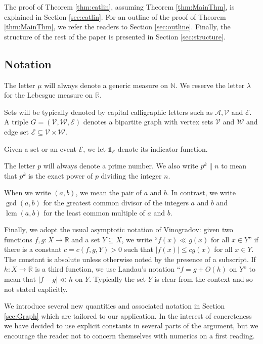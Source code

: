 \documentclass[12pt]{amsart}
\numberwithin{equation}{section}
\theoremstyle{definition}
\theoremstyle{remark}
\newcommand{\N}{\mathbb{N}}
\newcommand{\R}{\mathbb{R}}
\newcommand{\CA}{\mathcal{A}}
\newcommand{\CE}{\mathcal{E}}
\newcommand{\CV}{\mathcal{V}}
\newcommand{\CW}{\mathcal{W}}
\newcommand{\un}{\mathds{1}}
\DeclareMathOperator{\lcm}{lcm}
\renewcommand{\le}{\leqslant}
\begin{document}
The proof of Theorem \ref{thm:catlin}, assuming Theorem \ref{thm:MainThm}, is explained in Section \ref{sec:catlin}. For an outline of the proof of Theorem \ref{thm:MainThm}, we refer the readers to Section \ref{sec:outline}. Finally, the structure of the rest of the paper is presented in Section \ref{sec:structure}.


\subsection*{Notation} The letter $\mu$ will always denote a generic measure on $\N$. We reserve the letter $\lambda$ for the Lebesgue measure on $\R$.

Sets will be typically denoted by capital calligraphic letters such as $\CA,\CV$ and $\CE$. A triple $G=(\CV,\CW,\CE)$ denotes a bipartite graph with vertex sets $\CV$ and $\CW$ and edge set $\CE\subseteq\CV\times\CW$. 

Given a set or an event $\CE$, we let $\un_\CE$ denote its indicator function.

The letter $p$ will always denote a prime number. We also write $p^k\|n$ to mean that $p^k$ is the exact power of $p$ dividing the integer $n$. 

When we write $(a,b)$, we mean the pair of $a$ and $b$. In contrast, we write $\gcd(a,b)$ for the greatest common divisor of the integers $a$ and $b$ and $\lcm(a,b)$ for the least common multiple of $a$ and $b$. 

Finally, we adopt the usual asymptotic notation of Vinogradov: given two functions $f,g:X\to\R$ and a set $Y\subseteq X$, we write ``$f(x)\ll g(x)$ for all $x\in Y$'' if there is a constant $c=c(f,g,Y)>0$ such that $|f(x)|\le cg(x)$ for all $x\in Y$. The constant is absolute unless otherwise noted by the presence of a subscript. If $h:X\to\R$ is a third function, we use Landau's notation ``$f=g+O(h)$ on $Y$'' to mean that $|f-g|\ll h$ on $Y$. Typically the set $Y$ is clear from the context and so not stated explicitly.

We introduce several new quantities and associated notation in Section \ref{sec:Graph} which are tailored to our application. In the interest of concreteness we have decided to use explicit constants in several parts of the argument, but we encourage the reader not to concern themselves with numerics on a first reading.
\end{document}

